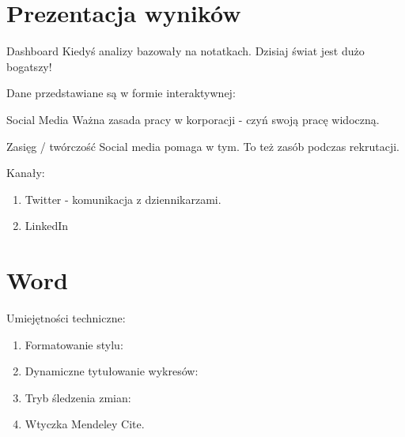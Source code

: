 \documentclass{beamer}
\begin{document}
\section{Prezentacja wyników}
\begin{frame}{Dashboard}
	Kiedyś analizy bazowały na notatkach. 
	\vspace{5mm}	
	Dzisiaj świat jest dużo bogatszy!
	\vspace{5mm}
	
	Dane przedstawiane są w formie interaktywnej: 
	\href{	https://www.bruegel.org/dataset/national-policies-shield-consumers-rising-energy-prices}{}
\end{frame}

\begin{frame}{Social Media}
	Ważna zasada pracy w korporacji - czyń swoją pracę widoczną.

	\vspace{5mm}	 
	Zasięg / twórczość Social media pomaga w tym. To też zasób podczas rekrutacji. 
	
	\vspace{5mm}	
	Kanały:
	\begin{enumerate}
		\item Twitter - komunikacja z dziennikarzami. 
		\item LinkedIn 
	\end{enumerate}
	
\end{frame}


\section{Word}
\begin{frame}{Umiejętności techniczne:}
	
	\begin{enumerate}
		\item Formatowanie stylu: \href{	https://support.microsoft.com/en-us/office/customize-or-create-new-styles-d38d6e47-f6fc-48eb-a607-1eb120dec563
		}{} 
		\item Dynamiczne tytułowanie wykresów: \href{https://support.microsoft.com/en-us/office/add-format-or-delete-captions-in-word-82fa82a4-f0f3-438f-a422-34bb5cef9c81}{}
		\item Tryb śledzenia zmian: \href{https://support.microsoft.com/en-us/office/track-changes-in-word-197ba630-0f5f-4a8e-9a77-3712475e806a}{}
		\item Wtyczka Mendeley Cite. 
	\end{enumerate}
	\vspace{5mm}
			
\end{frame}
\end{document}
